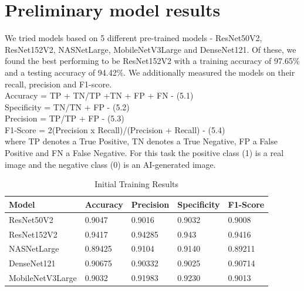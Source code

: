 \section{Preliminary model results}

\fontsize{12pt}{24pt}\selectfont We tried models based on 5 different pre-trained models - ResNet50V2, ResNet152V2, NASNetLarge, MobileNetV3Large and DenseNet121. Of these, we found the best performing to be ResNet152V2 with a training accuracy of 97.65\% and a testing accuracy of 94.42\%. We additionally measured the models on their recall, precision and F1-score. \\
Accuracy = TP + TN/TP +TN + FP + FN					-  (5.1)\\
Specificity = TN/TN + FP							-  (5.2)\\
Precision = TP/TP + FP						    	-  (5.3)\\
F1-Score = 2(Precision x Recall)/(Precision + Recall) -  (5.4)\\
where TP denotes a True Positive, TN denotes a True Negative, FP a False Positive and FN a False Negative. For this task the positive class (1) is a real image and the negative class (0) is an AI-generated image.
\begin{table}[H]
\begin{center}
\begin{tabular}{|l|l|l|l|l|}
\hline
Model & Accuracy  & Precision & Specificity & F1-Score\\ \hline
ResNet50V2   & 0.9047 & 0.9016 & 0.9032 & 0.9008         \\ \hline
ResNet152V2   & 0.9417 & 0.94285 & 0.943 & 0.9416      \\ \hline
NASNetLarge  & 0.89425 & 0.9104 & 0.9140 & 0.89211      \\ \hline
DenseNet121   & 0.90675 & 0.90332 & 0.9025 & 0.90714      \\ \hline
MobileNetV3Large   & 0.9032 & 0.91983 & 0.9230 & 0.9013      \\ \hline

\end{tabular}
\end{center}
\caption{Initial Training Results}
\end{table}

